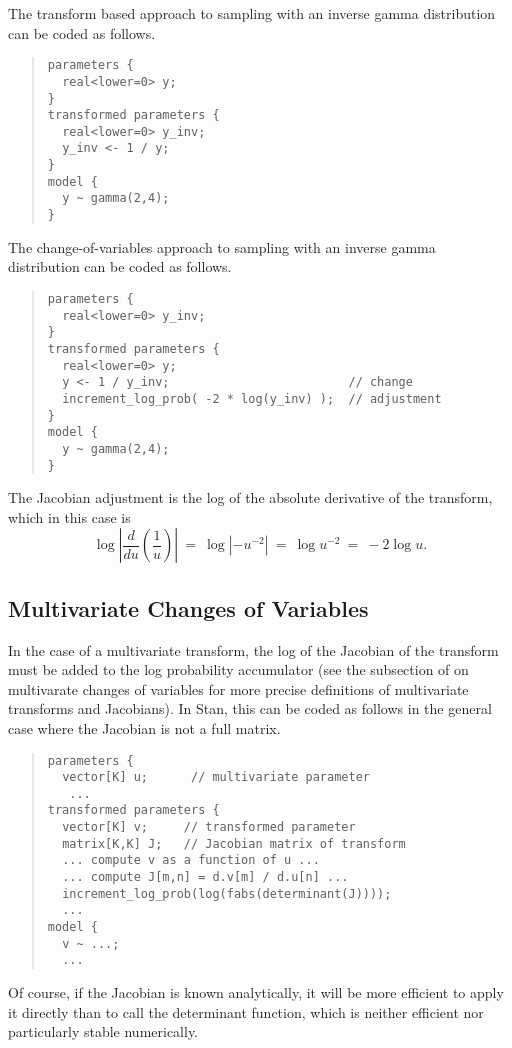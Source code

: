 The transform based approach to sampling  with an inverse
gamma distribution can be coded as follows.
%
\begin{quote}
\begin{Verbatim}
parameters {
  real<lower=0> y;
}
transformed parameters {
  real<lower=0> y_inv;   
  y_inv <- 1 / y;
}
model {
  y ~ gamma(2,4);
}
\end{Verbatim}
\end{quote}
%
The change-of-variables approach to sampling  with an
inverse gamma distribution can be coded as follows.
%
\begin{quote}
\begin{Verbatim}
parameters {
  real<lower=0> y_inv;
}
transformed parameters {
  real<lower=0> y;
  y <- 1 / y_inv;                         // change
  increment_log_prob( -2 * log(y_inv) );  // adjustment
}
model {
  y ~ gamma(2,4);
}
\end{Verbatim}
\end{quote}
%
The Jacobian adjustment is the log of the absolute derivative of the
transform, which in this case is
%
\[
\log \left| \frac{d}{du} \left( \frac{1}{u} \right) \right|
\ = \
\log | - u^{-2} |
\ = \
\log u^{-2}
\ = \
 -2 \log u.
\]


\subsection{Multivariate Changes of Variables}

In the case of a multivariate transform, the log of the Jacobian of
the transform must be added to the log probability accumulator (see
the subsection of  on multivarate
changes of variables for more precise definitions of multivariate
transforms and Jacobians).  In Stan, this can be coded as follows in
the general case where the Jacobian is not a full matrix.
%
\begin{quote}
\begin{Verbatim}[fontsize=\small]
parameters {
  vector[K] u;      // multivariate parameter
   ...
transformed parameters {
  vector[K] v;     // transformed parameter
  matrix[K,K] J;   // Jacobian matrix of transform
  ... compute v as a function of u ...
  ... compute J[m,n] = d.v[m] / d.u[n] ...
  increment_log_prob(log(fabs(determinant(J))));
  ...
model {
  v ~ ...;
  ...
\end{Verbatim}
\end{quote}
%
Of course, if the Jacobian is known analytically, it will be more
efficient to apply it directly than to call the determinant function,
which is neither efficient nor particularly stable numerically.

